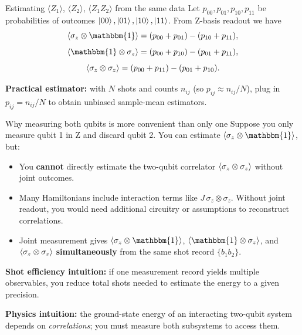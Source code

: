 \documentclass[aspectratio=169]{beamer}
\newcommand{\Z}{\sigma_z}
\newcommand{\I}{\mathbbm{1}}
\begin{document}
\begin{frame}{Estimating \(\langle Z_1\rangle\), \(\langle Z_2\rangle\), \(\langle Z_1 Z_2\rangle\) from the same data}
Let \(p_{00},p_{01},p_{10},p_{11}\) be probabilities of outcomes \(\ket{00},\ket{01},\ket{10},\ket{11}\).
From Z-basis readout we have
\[
\expval{\Z\otimes \I}= (p_{00}+p_{01})-(p_{10}+p_{11}),
\]
\[
\expval{\I\otimes \Z}= (p_{00}+p_{10})-(p_{01}+p_{11}),
\]
\[
\expval{\Z\otimes \Z}= (p_{00}+p_{11})-(p_{01}+p_{10}).
\]

\medskip
\textbf{Practical estimator:} with \(N\) shots and counts \(n_{ij}\) (so \(p_{ij}\approx n_{ij}/N\)),
plug in \(p_{ij}=n_{ij}/N\) to obtain unbiased sample-mean estimators.
\end{frame}

\begin{frame}{Why measuring both qubits is more convenient than only one}
Suppose you only measure qubit 1 in Z and discard qubit 2. You can estimate \(\expval{\Z\otimes\I}\), but:
\begin{itemize}
  \item You \textbf{cannot} directly estimate the two-qubit correlator \(\expval{\Z\otimes \Z}\) without joint outcomes.
  \item Many Hamiltonians include interaction terms like \(J\,\Z\otimes \Z\). Without joint readout, you would need additional circuitry or assumptions to reconstruct correlations.
  \item Joint measurement gives \(\expval{\Z\otimes\I}\), \(\expval{\I\otimes\Z}\), and \(\expval{\Z\otimes\Z}\) \textbf{simultaneously} from the same shot record \(\{b_1 b_2\}\).
\end{itemize}

\medskip
\textbf{Shot efficiency intuition:} if one measurement record yields multiple observables, you reduce total shots needed to estimate the energy to a given precision.

\medskip
\textbf{Physics intuition:} the ground-state energy of an interacting two-qubit system depends on \emph{correlations}; you must measure both subsystems to access them.
\end{frame}
\end{document}
